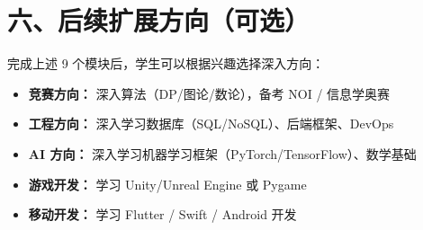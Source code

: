 \documentclass[a4paper,12pt]{ctexart}
\begin{document}
\section*{六、后续扩展方向（可选）}

完成上述 9 个模块后，学生可以根据兴趣选择深入方向：
\begin{itemize}
  \item \textbf{竞赛方向：} 深入算法（DP/图论/数论），备考 NOI / 信息学奥赛
  \item \textbf{工程方向：} 深入学习数据库（SQL/NoSQL）、后端框架、DevOps
  \item \textbf{AI 方向：} 深入学习机器学习框架（PyTorch/TensorFlow）、数学基础
  \item \textbf{游戏开发：} 学习 Unity/Unreal Engine 或 Pygame
  \item \textbf{移动开发：} 学习 Flutter / Swift / Android 开发
\end{itemize}
\end{document}
